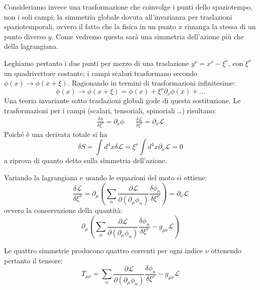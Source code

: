 Consideriamo invece una trasformazione che coinvolge i punti dello spaziotempo, non i soli campi; la simmetria globale dovuta all'invarianza per traslazioni spaziotemporali, ovvero il fatto che la fisica in un punto $x$ rimanga la stessa di un punto diverso $y$. Come vedremo questa sarà una simmetria dell'azione più che della lagrangiana.

Leghiamo pertanto i due punti per mezzo di una traslazione $y^\nu = x^\nu - \xi^\nu$, con $\xi^\nu$ un quadrivettore costante; i campi scalari trasformano secondo $\phi(x) \rightarrow \phi(x+\xi)$. Ragionando in termini di trasformazioni infinitesime:
\begin{equation*}
    \phi(x) \rightarrow \phi(x+\xi) = \phi(x) + \xi^\nu \partial_\nu \phi(x) + \dots 
\end{equation*}
Una teoria invariante sotto traslazioni globali gode di questa sostituzione.
Le trasformazioni per i campi (scalari, tensoriali, spinoriali \dots ) risultano:
\begin{equation*}
    \begin{array}{ccc}
        \frac{\delta \phi}{\delta \xi^\nu} = \partial_\nu \phi & & \frac{\delta \mathcal{L}}{\delta \xi^\nu} = \partial_\nu \mathcal{L}
    \end{array}
\end{equation*}
Poiché è una derivata totale si ha
\begin{equation*}
    \delta S = \int d^4 x \delta \mathcal{L} = \xi^\nu \int d^4 x \partial_\nu \mathcal{L} = 0
\end{equation*}
a riprova di quanto detto sulla simmetria dell'azione.

Variando la lagrangiana e usando le equazioni del moto si ottiene:
\begin{equation*}
    \frac{\delta \mathcal{L}}{\delta \xi^\nu} = \partial_\mu \left( \sum_n \frac{\partial \mathcal{L}}{\partial (\partial_\mu \phi_n)}\frac{\delta \phi_n}{\delta \xi^\nu} \right) = \partial_\nu\mathcal{L}
\end{equation*}
ovvero la conservazione della quantità:
\begin{equation*}
    \partial_\mu \left( \sum_n \frac{\partial \mathcal{L}}{\partial (\partial_\mu \phi_n)}\frac{\delta \phi_n}{\delta \xi^\nu}  - g_{\mu\nu}\mathcal{L}\right)
\end{equation*}

Le quattro simmetrie producono quattro correnti per ogni indice $\nu$ ottenendo pertanto il tensore:
\begin{equation}
    T_{\mu\nu} = \sum_n \frac{\partial \mathcal{L}}{\partial (\partial_\mu \phi_n)}\frac{\delta \phi_n}{\delta \xi^\nu}  - g_{\mu\nu}\mathcal{L}
    \label{eq.tensore_enimpulso_teocampi}
\end{equation}
